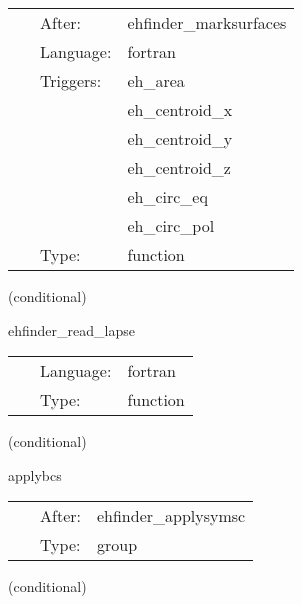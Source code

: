  \begin{tabular*}{160mm}{cll} 
~ & After:  & ehfinder\_marksurfaces \\ 
~ & Language:  & fortran \\ 
~ & Triggers:  & eh\_area \\ 
~& ~ &eh\_centroid\_x\\ 
~& ~ &eh\_centroid\_y\\ 
~& ~ &eh\_centroid\_z\\ 
~& ~ &eh\_circ\_eq\\ 
~& ~ &eh\_circ\_pol\\ 
~ & Type:  & function \\ 
\end{tabular*} 


\vspace{5mm}

   (conditional) 

\hspace{5mm} ehfinder\_read\_lapse 

\hspace{5mm}{\it read in lapse from file } 


\hspace{5mm}

 \begin{tabular*}{160mm}{cll} 
~ & Language:  & fortran \\ 
~ & Type:  & function \\ 
\end{tabular*} 


\vspace{5mm}

   (conditional) 

\hspace{5mm} applybcs 

\hspace{5mm}{\it apply boundary conditions (symmetries) } 


\hspace{5mm}

 \begin{tabular*}{160mm}{cll} 
~ & After:  & ehfinder\_applysymsc \\ 
~ & Type:  & group \\ 
\end{tabular*} 


\vspace{5mm}

   (conditional) 

